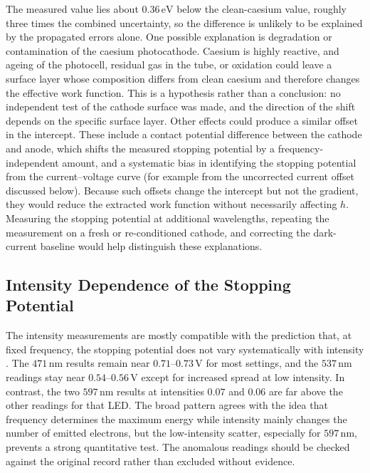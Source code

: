 \documentclass[12pt,a4paper]{article}
\begin{document}
The measured value lies about \(0.36\,\mathrm{eV}\) below the clean-caesium value, roughly three times the combined uncertainty, so the difference is unlikely to be explained by the propagated errors alone. One possible explanation is degradation or contamination of the caesium photocathode. Caesium is highly reactive, and ageing of the photocell, residual gas in the tube, or oxidation could leave a surface layer whose composition differs from clean caesium and therefore changes the effective work function. This is a hypothesis rather than a conclusion: no independent test of the cathode surface was made, and the direction of the shift depends on the specific surface layer. Other effects could produce a similar offset in the intercept. These include a contact potential difference between the cathode and anode, which shifts the measured stopping potential by a frequency-independent amount, and a systematic bias in identifying the stopping potential from the current--voltage curve (for example from the uncorrected current offset discussed below). Because such offsets change the intercept but not the gradient, they would reduce the extracted work function without necessarily affecting \(h\). Measuring the stopping potential at additional wavelengths, repeating the measurement on a fresh or re-conditioned cathode, and correcting the dark-current baseline would help distinguish these explanations.

\subsection{Intensity Dependence of the Stopping Potential}

The intensity measurements are mostly compatible with the prediction that, at fixed frequency, the stopping potential does not vary systematically with intensity \cite{einstein1905,lenard1902}. The \(471\,\mathrm{nm}\) results remain near \(0.71\)--\(0.73\,\mathrm{V}\) for most settings, and the \(537\,\mathrm{nm}\) readings stay near \(0.54\)--\(0.56\,\mathrm{V}\) except for increased spread at low intensity. In contrast, the two \(597\,\mathrm{nm}\) results at intensities \(0.07\) and \(0.06\) are far above the other readings for that LED. The broad pattern agrees with the idea that frequency determines the maximum energy while intensity mainly changes the number of emitted electrons, but the low-intensity scatter, especially for \(597\,\mathrm{nm}\), prevents a strong quantitative test. The anomalous readings should be checked against the original record rather than excluded without evidence.
\end{document}
